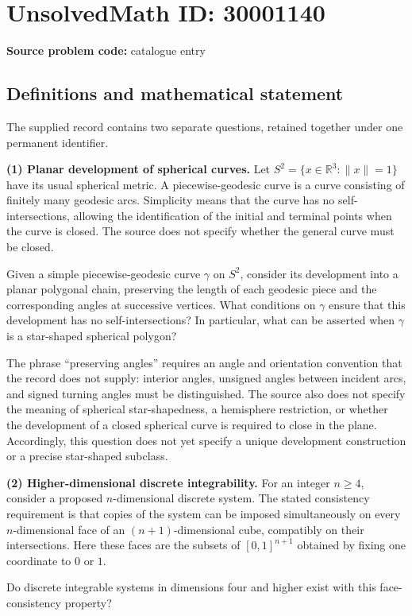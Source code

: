 \documentclass[11pt]{article}
\newcommand{\R}{\mathbb{R}}
\begin{document}
\section*{UnsolvedMath ID: 30001140}
\textbf{Source problem code:} catalogue entry
\subsection{Definitions and mathematical statement}
The supplied record contains two separate questions, retained together under one permanent identifier.

\textbf{(1) Planar development of spherical curves.} Let \(S^2=\{x\in\R^3:\|x\|=1\}\) have its usual spherical metric. A piecewise-geodesic curve is a curve consisting of finitely many geodesic arcs. Simplicity means that the curve has no self-intersections, allowing the identification of the initial and terminal points when the curve is closed. The source does not specify whether the general curve must be closed.

Given a simple piecewise-geodesic curve \(\gamma\) on \(S^2\), consider its development into a planar polygonal chain, preserving the length of each geodesic piece and the corresponding angles at successive vertices. What conditions on \(\gamma\) ensure that this development has no self-intersections? In particular, what can be asserted when \(\gamma\) is a star-shaped spherical polygon?

The phrase ``preserving angles'' requires an angle and orientation convention that the record does not supply: interior angles, unsigned angles between incident arcs, and signed turning angles must be distinguished. The source also does not specify the meaning of spherical star-shapedness, a hemisphere restriction, or whether the development of a closed spherical curve is required to close in the plane. Accordingly, this question does not yet specify a unique development construction or a precise star-shaped subclass.

\textbf{(2) Higher-dimensional discrete integrability.} For an integer \(n\geq4\), consider a proposed \(n\)-dimensional discrete system. The stated consistency requirement is that copies of the system can be imposed simultaneously on every \(n\)-dimensional face of an \((n+1)\)-dimensional cube, compatibly on their intersections. Here these faces are the subsets of \([0,1]^{n+1}\) obtained by fixing one coordinate to \(0\) or \(1\).

Do discrete integrable systems in dimensions four and higher exist with this face-consistency property?
\end{document}

